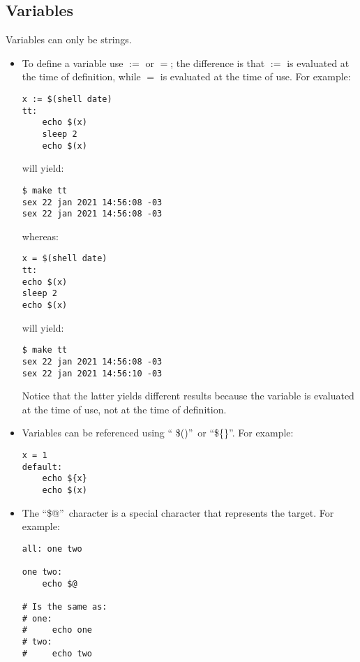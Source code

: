 \subsection{Variables}

Variables can only be strings. 
\begin{itemize}
    \item To define a variable use $:=$ or $=$; the difference is that $:=$ is
    evaluated at the time of definition, while $=$ is evaluated at the time of
    use. For example:
    \begin{verbatim}
x := $(shell date)
tt:
    echo $(x)
    sleep 2
    echo $(x)
    \end{verbatim}
    will yield:
    \begin{verbatim}
$ make tt
sex 22 jan 2021 14:56:08 -03
sex 22 jan 2021 14:56:08 -03
    \end{verbatim}
    whereas:
    \begin{verbatim}
x = $(shell date)
tt:
echo $(x)
sleep 2
echo $(x)
    \end{verbatim}
    will yield:
    \begin{verbatim}
$ make tt
sex 22 jan 2021 14:56:08 -03
sex 22 jan 2021 14:56:10 -03
    \end{verbatim}
    Notice that the latter yields different results because the variable is 
    evaluated at the time of use, not at the time of definition.
    \item Variables can be referenced using \textquotedblleft
    \$()\textquotedblright\ or \textquotedblleft \$\{\}\textquotedblright. For
    example:
    \begin{verbatim}
x = 1
default:
    echo ${x}
    echo $(x)
    \end{verbatim}
    \item The \textquotedblleft \$@\textquotedblright\ character is a special
    character that represents the target. For example:
    \begin{verbatim}
all: one two

one two:
    echo $@

# Is the same as:
# one:
#     echo one
# two:
#     echo two
    \end{verbatim}
\end{itemize}

